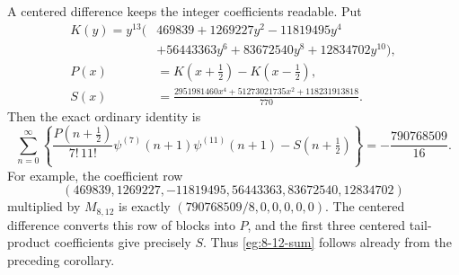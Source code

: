 A centered difference keeps the integer coefficients readable. Put
\begin{align*}
 K(y)=y^{13}\bigl(&469839+1269227y^2-11819495y^4\\
                 &+56443363y^6+83672540y^8+12834702y^{10}\bigr),\\
 P(x)&=K(x+\tfrac12)-K(x-\tfrac12),\\
 S(x)&=\frac{2951981460x^4+51273021735x^2+118231913818}{770}.
\end{align*}
Then the exact ordinary identity is
\begin{equation}\label{eg:8-12-sum}
 \boxed{\displaystyle
 \sum_{n=0}^{\infty}\left\{
 \frac{P(n+\tfrac12)}{7!\,11!}
       \psi^{(7)}(n+1)\psi^{(11)}(n+1)-S(n+\tfrac12)\right\}
 =-\frac{790768509}{16}.}
\end{equation}
For example, the coefficient row
\[
 (469839,1269227,-11819495,56443363,83672540,12834702)
\]
multiplied by $M_{8,12}$ is exactly
$(790768509/8,0,0,0,0,0)$. The centered difference converts this row
of blocks into $P$, and the first three centered tail-product
coefficients give precisely $S$. Thus \eqref{eg:8-12-sum} follows
already from the preceding corollary.

